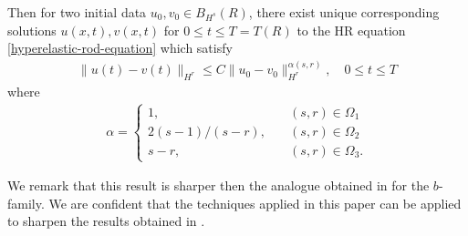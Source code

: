 \documentclass[12pt,reqno]{amsart}
\numberwithin{equation}{section}  %
\numberwithin{figure}{section}
\begin{document}
%
\begin{center}
\end{center}
%
%
Then for two initial data $u_{0}, v_{0} \in B_{H^{s}}(R)$, there exist unique
corresponding solutions $u(x,t), v(x,t)$ for $0 \le t \le T= T(R)$ to the
HR equation \eqref{hyperelastic-rod-equation} which satisfy 
%
%
\begin{equation*}
\begin{split}
\| u(t) - v(t) \|_{H^{r}} \le C \| u_{0} - v_{0} \|_{H^{r}}^{\alpha(s, r)},
\quad 0
\le t \le T
\end{split}
\end{equation*}
%
%
where 
%
%
\begin{equation*}
\begin{split}
\alpha = 
\begin{cases}
1, \quad & (s,r) \in \Omega_{1} 
\\
2(s-1)/(s-r),  \quad & (s, r) \in \Omega_{2}
\\
s-r, \quad & (s, r) \in \Omega_{3}.
\end{cases}
\end{split}
\end{equation*}
%

%
%
%
%
%
%
%
We remark that this result is sharper then the analogue obtained in
\cite{Chen:2011fk} for the $b$-family. We are confident that the techniques
applied in this paper can be applied to sharpen the results obtained in
\cite{Chen:2011fk}.
%
%
%
\end{document}
